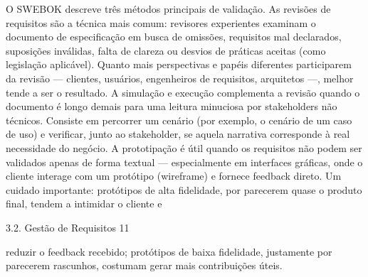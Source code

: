 O SWEBOK descreve três métodos principais de validação. As revisões de requisitos são a técnica mais comum: revisores experientes examinam o documento de especificação em busca de omissões, requisitos mal declarados, suposições inválidas, falta de clareza ou desvios de práticas aceitas (como legislação aplicável). Quanto mais perspectivas e papéis diferentes participarem da revisão — clientes, usuários, engenheiros de requisitos, arquitetos —, melhor tende a ser o resultado. A simulação e execução complementa a revisão quando o documento é longo demais para uma leitura minuciosa por stakeholders não técnicos. Consiste em percorrer um cenário (por exemplo, o cenário de um caso de uso) e verificar, junto ao stakeholder, se aquela narrativa corresponde à real necessidade do negócio. A prototipação é útil quando os requisitos não podem ser validados apenas de forma textual — especialmente em interfaces gráficas, onde o cliente interage com um protótipo (wireframe) e fornece feedback direto. Um cuidado importante: protótipos de alta fidelidade, por parecerem quase o produto final, tendem a intimidar o cliente e

3.2. Gestão de Requisitos 11

reduzir o feedback recebido; protótipos de baixa fidelidade, justamente por parecerem rascunhos, costumam gerar mais contribuições úteis.

